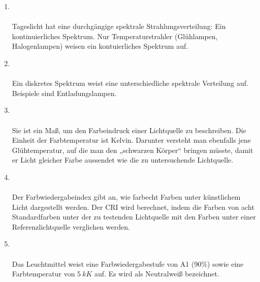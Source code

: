 \begin{enumerate}
    \item   {} \\\\
            Tageslicht hat eine durchgängige spektrale Strahlungsverteilung: Ein kontinuierliches Spektrum. Nur Temperaturstrahler (Glühlampen, Halogenlampen) weisen ein kontuierliches Spektrum auf.

    \item   {}\\\\
            Ein diskretes Spektrum weist eine unterschiedliche spektrale Verteilung auf. Beispiele sind Entladungslampen.

    \item   {}\\\\
            Sie ist ein Maß, um den Farbeindruck einer Lichtquelle zu beschreiben. Die Einheit der Farbtemperatur ist Kelvin. Darunter versteht man ebenfalls jene Glühtemperatur, auf die man den „schwarzen Körper“ bringen müsste, damit er Licht gleicher Farbe aussendet wie die zu untersuchende Lichtquelle.


    \item   {}\\\\
            Der Farbwiedergabeindex gibt an, wie farbecht Farben unter künstlichem Licht dargestellt werden.
            Der CRI wird berechnet, indem die Farben von acht Standardfarben unter der zu testenden Lichtquelle mit den Farben unter einer Referenzlichtquelle verglichen werden.

    \item   {}\\\\
            Das Leuchtmittel weist eine Farbwiedergabestufe von A1 (90\%) sowie eine Farbtemperatur von $\SI{5}{kK}$ auf. Es wird als 
            Neutralweiß bezeichnet.
\end{enumerate}

